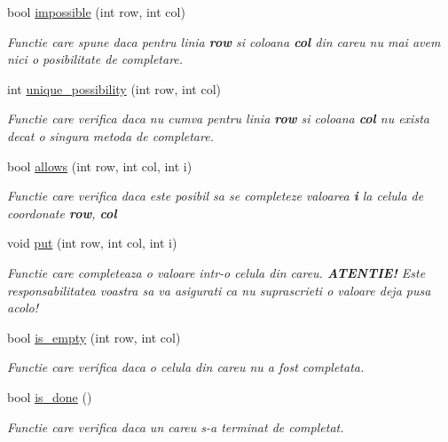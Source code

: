 \begin{DoxyCompactItemize}
\item 
bool \hyperlink{classSudokuBoard_aa5d810273b58996f5eb00522dc04c012}{impossible} (int row, int col)
\begin{DoxyCompactList}\small\item\em Functie care spune daca pentru linia {\bfseries row} si coloana {\bfseries col} din careu nu mai avem nici o posibilitate de completare. \end{DoxyCompactList}\item 
int \hyperlink{classSudokuBoard_add88bcf66d345b2822335d92713b8714}{unique\_\-possibility} (int row, int col)
\begin{DoxyCompactList}\small\item\em Functie care verifica daca nu cumva pentru linia {\bfseries row} si coloana {\bfseries col} nu exista decat o singura metoda de completare. \end{DoxyCompactList}\item 
bool \hyperlink{classSudokuBoard_a4ae4146f3ebed70288b41adb9ee1d8ed}{allows} (int row, int col, int i)
\begin{DoxyCompactList}\small\item\em Functie care verifica daca este posibil sa se completeze valoarea {\bfseries i} la celula de coordonate {\bfseries row}, {\bfseries col} \end{DoxyCompactList}\item 
void \hyperlink{classSudokuBoard_aff759e2337f20e107ed7e70d5cd8ca41}{put} (int row, int col, int i)
\begin{DoxyCompactList}\small\item\em Functie care completeaza o valoare intr-\/o celula din careu. {\bfseries ATENTIE!} Este responsabilitatea voastra sa va asigurati ca nu suprascrieti o valoare deja pusa acolo! \end{DoxyCompactList}\item 
bool \hyperlink{classSudokuBoard_a1e4d6cac572c9f4d4a573265da99f517}{is\_\-empty} (int row, int col)
\begin{DoxyCompactList}\small\item\em Functie care verifica daca o celula din careu nu a fost completata. \end{DoxyCompactList}\item 
bool \hyperlink{classSudokuBoard_ad53cca0148ad57fdaa05f9b92000fe66}{is\_\-done} ()
\begin{DoxyCompactList}\small\item\em Functie care verifica daca un careu s-\/a terminat de completat. \end{DoxyCompactList}\end{DoxyCompactItemize}

